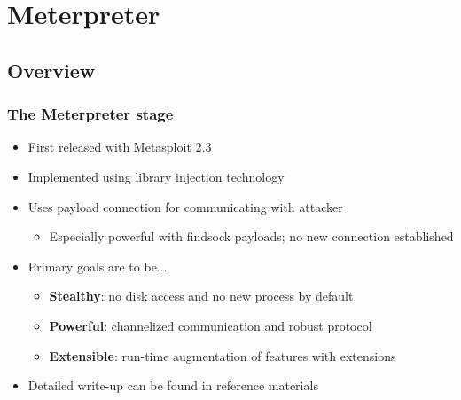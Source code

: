 \documentclass{beamer}
\newenvironment{sitemize}{\vspace{1mm}\begin{itemize}\itemsep 4pt\small}{\end{itemize}}
\begin{document}

\section{Meterpreter}

\subsection{Overview}

\begin{frame}[t]
    \frametitle{The Meterpreter stage}

    \begin{sitemize}
        \item First released with Metasploit 2.3
        \item Implemented using library injection technology

        \pause
        \item Uses payload connection for communicating with
        attacker
        \begin{sitemize}
            \item Especially powerful with findsock payloads; no new
            connection established
        \end{sitemize}
    \end{sitemize}

    \pause
    \begin{sitemize}
        \item Primary goals are to be...
        \begin{sitemize}
            \item \textbf{Stealthy}: no disk access and no new process by default
            \item \textbf{Powerful}: channelized communication and robust protocol
            \item \textbf{Extensible}: run-time augmentation of features with extensions
        \end{sitemize}
    \end{sitemize}

    \pause
    \begin{sitemize}
        \item Detailed write-up can be found in reference materials
    \end{sitemize}
\end{frame}
\end{document}
